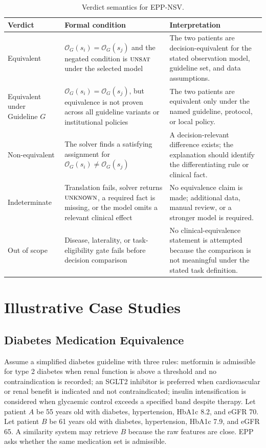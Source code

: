\documentclass[english,5p,twocolumn,preprint]{elsarticle}
\newcommand{\Obs}{\mathcal{O}}
\newcommand{\unsat}{\textsc{unsat}}
\newcommand{\unknown}{\textsc{unknown}}
\begin{document}
\begin{table}[ht!]
\centering
\caption{Verdict semantics for EPP-NSV.}
\label{tab:verdicts}
\begin{threeparttable}
\begin{tabularx}{\textwidth}{p{}p{}X}
\toprule
\textbf{Verdict} & \textbf{Formal condition} & \textbf{Interpretation} \\
\midrule
Equivalent & $\Obs_G(s_i)=\Obs_G(s_j)$ and the negated condition is $\unsat$ under the selected model & The two patients are decision-equivalent for the stated observation model, guideline set, and data assumptions. \\
Equivalent under Guideline $G$ & $\Obs_G(s_i)=\Obs_G(s_j)$, but equivalence is not proven across all guideline variants or institutional policies & The two patients are equivalent only under the named guideline, protocol, or local policy. \\
Non-equivalent & The solver finds a satisfying assignment for $\Obs_G(s_i)\neq\Obs_G(s_j)$ & A decision-relevant difference exists; the explanation should identify the differentiating rule or clinical fact. \\
Indeterminate & Translation fails, solver returns $\unknown$, a required fact is missing, or the model omits a relevant clinical effect & No equivalence claim is made; additional data, manual review, or a stronger model is required. \\
Out of scope & Disease, laterality, or task-eligibility gate fails before decision comparison & No clinical-equivalence statement is attempted because the comparison is not meaningful under the stated task definition. \\
\bottomrule
\end{tabularx}
\end{threeparttable}
\end{table}

\section{Illustrative Case Studies}
\subsection{Diabetes Medication Equivalence}
Assume a simplified diabetes guideline with three rules: metformin is admissible for type 2 diabetes when renal function is above a threshold and no contraindication is recorded; an SGLT2 inhibitor is preferred when cardiovascular or renal benefit is indicated and not contraindicated; insulin intensification is considered when glycaemic control exceeds a specified band despite therapy. Let patient $A$ be 55 years old with diabetes, hypertension, HbA1c 8.2, and eGFR 70. Let patient $B$ be 61 years old with diabetes, hypertension, HbA1c 7.9, and eGFR 65. A similarity system may retrieve $B$ because the raw features are close. EPP asks whether the same medication set is admissible.
\end{document}
